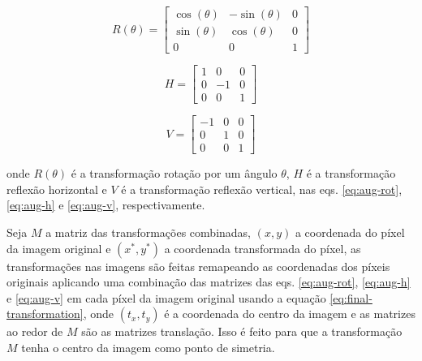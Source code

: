 \begin{equation}\label{eq:aug-rot}
  R(\theta) =
  \begin{bmatrix}
    \cos(\theta) & -\sin(\theta) & 0 \\
    \sin(\theta) & \cos(\theta)  & 0 \\
    0            & 0             & 1
  \end{bmatrix}
\end{equation}


\begin{equation}\label{eq:aug-h}
  H =
  \begin{bmatrix}
    1 & 0  & 0 \\
    0 & -1 & 0 \\
    0 & 0  & 1
  \end{bmatrix}
\end{equation}


\begin{equation}\label{eq:aug-v}
  V =
  \begin{bmatrix}
    -1 & 0 & 0 \\
    0  & 1 & 0 \\
    0  & 0 & 1
  \end{bmatrix}
\end{equation}


onde $R(\theta)$ é a transformação rotação por um ângulo $\theta$,
$H$ é a transformação reflexão horizontal e $V$ é a transformação reflexão vertical, nas eqs. \eqref{eq:aug-rot}, \eqref{eq:aug-h} e \eqref{eq:aug-v}, respectivamente.

Seja $M$ a matriz das transformações combinadas, $(x, y)$ a coordenada do píxel da imagem original e $(x^*, y^*)$ a coordenada transformada do píxel, as transformações nas imagens são feitas remapeando as coordenadas dos píxeis originais aplicando uma combinação das matrizes das eqs. \eqref{eq:aug-rot}, \eqref{eq:aug-h} e \eqref{eq:aug-v} em cada píxel da imagem original usando a equação \eqref{eq:final-transformation}, onde $(t_x, t_y)$ é a coordenada do centro da imagem e as matrizes ao redor de $M$ são as matrizes translação. Isso é feito para que a transformação $M$ tenha o centro da imagem como ponto de simetria.

